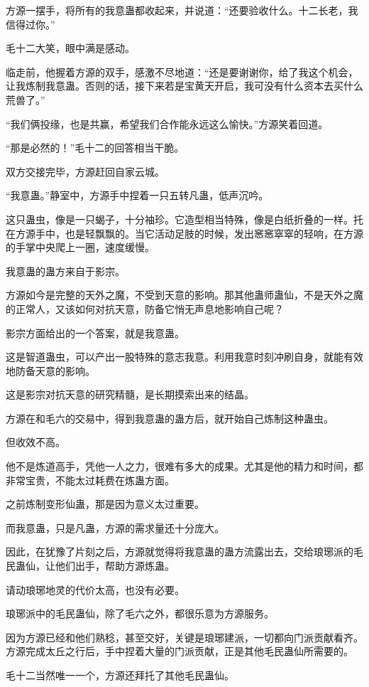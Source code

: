 \begin{this_body}
方源一摆手，将所有的我意蛊都收起来，并说道：“还要验收什么。十二长老，我信得过你。”

毛十二大笑，眼中满是感动。

临走前，他握着方源的双手，感激不尽地道：“还是要谢谢你，给了我这个机会，让我炼制我意蛊。否则的话，接下来若是宝黄天开启，我可没有什么资本去买什么荒兽了。”

“我们俩投缘，也是共赢，希望我们合作能永远这么愉快。”方源笑着回道。

“那是必然的！”毛十二的回答相当干脆。

双方交接完毕，方源赶回自家云城。

“我意蛊。”静室中，方源手中捏着一只五转凡蛊，低声沉吟。

这只蛊虫，像是一只蝎子，十分袖珍。它造型相当特殊，像是白纸折叠的一样。托在方源手中，也是轻飘飘的。当它活动足肢的时候，发出窸窸窣窣的轻响，在方源的手掌中央爬上一圈，速度缓慢。

我意蛊的蛊方来自于影宗。

方源如今是完整的天外之魔，不受到天意的影响。那其他蛊师蛊仙，不是天外之魔的正常人，又该如何对抗天意，防备它悄无声息地影响自己呢？

影宗方面给出的一个答案，就是我意蛊。

这是智道蛊虫，可以产出一股特殊的意志我意。利用我意时刻冲刷自身，就能有效地防备天意的影响。

这是影宗对抗天意的研究精髓，是长期摸索出来的结晶。

方源在和毛六的交易中，得到我意蛊的蛊方后，就开始自己炼制这种蛊虫。

但收效不高。

他不是炼道高手，凭他一人之力，很难有多大的成果。尤其是他的精力和时间，都非常宝贵，不能太过耗费在炼蛊方面。

之前炼制变形仙蛊，那是因为意义太过重要。

而我意蛊，只是凡蛊，方源的需求量还十分庞大。

因此，在犹豫了片刻之后，方源就觉得将我意蛊的蛊方流露出去，交给琅琊派的毛民蛊仙，让他们出手，帮助方源炼蛊。

请动琅琊地灵的代价太高，也没有必要。

琅琊派中的毛民蛊仙，除了毛六之外，都很乐意为方源服务。

因为方源已经和他们熟稔，甚至交好，关键是琅琊建派，一切都向门派贡献看齐。方源完成太丘之行后，手中捏着大量的门派贡献，正是其他毛民蛊仙所需要的。

毛十二当然唯一一个，方源还拜托了其他毛民蛊仙。


\end{this_body}
